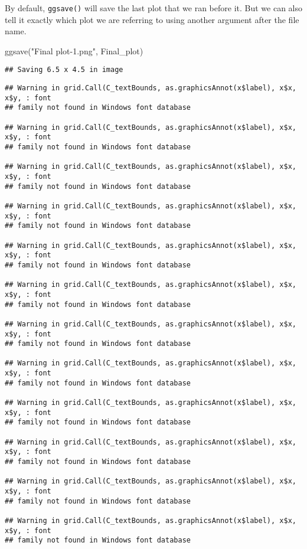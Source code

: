 \documentclass[
]{book}
\newenvironment{Shaded}{\begin{snugshade}}{\end{snugshade}}
\newcommand{\FunctionTok}[1]{\textcolor[rgb]{0.00,0.00,0.00}{#1}}
\newcommand{\NormalTok}[1]{#1}
\newcommand{\StringTok}[1]{\textcolor[rgb]{0.31,0.60,0.02}{#1}}
\begin{document}
By default, \texttt{ggsave()} will save the last plot that we ran before it. But we can also tell it exactly which plot we are referring to using another argument after the file name.

\begin{Shaded}
\begin{Highlighting}[]
\FunctionTok{ggsave}\NormalTok{(}\StringTok{"Final plot{-}1.png"}\NormalTok{, Final\_plot)}
\end{Highlighting}
\end{Shaded}

\begin{verbatim}
## Saving 6.5 x 4.5 in image
\end{verbatim}

\begin{verbatim}
## Warning in grid.Call(C_textBounds, as.graphicsAnnot(x$label), x$x, x$y, : font
## family not found in Windows font database

## Warning in grid.Call(C_textBounds, as.graphicsAnnot(x$label), x$x, x$y, : font
## family not found in Windows font database

## Warning in grid.Call(C_textBounds, as.graphicsAnnot(x$label), x$x, x$y, : font
## family not found in Windows font database

## Warning in grid.Call(C_textBounds, as.graphicsAnnot(x$label), x$x, x$y, : font
## family not found in Windows font database

## Warning in grid.Call(C_textBounds, as.graphicsAnnot(x$label), x$x, x$y, : font
## family not found in Windows font database

## Warning in grid.Call(C_textBounds, as.graphicsAnnot(x$label), x$x, x$y, : font
## family not found in Windows font database

## Warning in grid.Call(C_textBounds, as.graphicsAnnot(x$label), x$x, x$y, : font
## family not found in Windows font database

## Warning in grid.Call(C_textBounds, as.graphicsAnnot(x$label), x$x, x$y, : font
## family not found in Windows font database

## Warning in grid.Call(C_textBounds, as.graphicsAnnot(x$label), x$x, x$y, : font
## family not found in Windows font database

## Warning in grid.Call(C_textBounds, as.graphicsAnnot(x$label), x$x, x$y, : font
## family not found in Windows font database

## Warning in grid.Call(C_textBounds, as.graphicsAnnot(x$label), x$x, x$y, : font
## family not found in Windows font database

## Warning in grid.Call(C_textBounds, as.graphicsAnnot(x$label), x$x, x$y, : font
## family not found in Windows font database
\end{verbatim}
\end{document}
